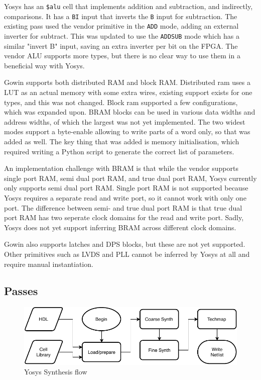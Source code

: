\documentclass{article}
\begin{document}
Yosys has an \texttt{\$alu} cell that implements addition and subtraction, and indirectly, comparisons. It has a \texttt{BI} input that inverts the \texttt{B} input for subtraction. The existing pass used the vendor primitive in the \texttt{ADD} mode, adding an external inverter for subtract. This was updated to use the \texttt{ADDSUB} mode which has a similar "invert B" input, saving an extra inverter per bit on the FPGA. The vendor ALU supports more types, but there is no clear way to use them in a beneficial way with Yosys.

Gowin supports both distributed RAM and block RAM. Distributed ram uses a LUT as an actual memory with some extra wires, existing support exists for one types, and this was not changed. Block ram supported a few configurations, which was expanded upon. BRAM blocks can be used in various data widths and address widths, of which the largest was not yet implemented. The two widest modes support a byte-enable allowing to write parts of a word only, so that was added as well. The key thing that was added is memory initialisation, which required writing a Python script to generate the correct list of parameters.

An implementation challenge with BRAM is that while the vendor supports single port RAM, semi dual port RAM, and true dual port RAM, Yosys currently only supports semi dual port RAM. Single port RAM is not supported because Yosys requires a separate read and write port, so it cannot work with only one port. The difference between semi- and true dual port RAM is that true dual port RAM has two seperate clock domains for the read and write port. Sadly, Yosys does not yet support inferring BRAM across different clock domains.

Gowin also supports latches and DPS blocks, but these are not yet supported. Other primitives such as LVDS and PLL cannot be inferred by Yosys at all and require manual instantiation.

\subsection{Passes}

\begin{figure}
    \centering
    \includegraphics[width=\textwidth]{fig/synthflow.pdf}
    \caption{Yosys Synthesis flow}
    \label{fig:synthflow}
\end{figure}
\end{document}
